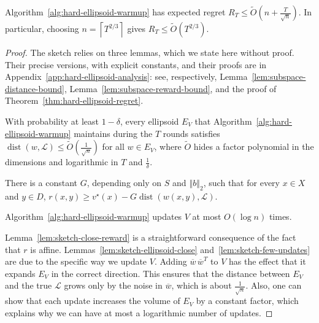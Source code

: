 {\begin{theorem}[Informal]\label{thm:hard-ellipsoid-warmup}
  Algorithm~\ref{alg:hard-ellipsoid-warmup} has expected regret $R_{T} \le \tilde{O} \left( n + \frac{T}{\sqrt{n}} \right)$. In particular, choosing $n = \left\lceil T^{2/3} \right\rceil$ gives
  $R_{T} \le \tilde{O} \left( T^{2/3} \right)$.

\end{theorem}


}

{
\begingroup
\renewcommand{\proofname}{Proof sketch}
\begin{proof}
The sketch relies on three lemmas, which we state here without proof. Their
precise versions, with explicit constants, and their proofs are in
Appendix~\ref{app:hard-ellipsoid-analysis}: see, respectively, Lemma~\ref{lem:subspace-distance-bound},
Lemma~\ref{lem:subspace-reward-bound}, and the proof of Theorem~\ref{thm:hard-ellipsoid-regret}.

\begin{lemma}\label{lem:sketch-ellipsoid-close}
With probability at least $1 - \delta$, every ellipsoid $E_{V}$ that
Algorithm~\ref{alg:hard-ellipsoid-warmup} maintains during the $T$ rounds satisfies
$\operatorname{dist} \left( w , \mathcal{L} \right) \le \tilde{O} \left( \frac{1}{\sqrt{n}} \right)$ for all
$w \in E_{V}$, where $\tilde{O}$ hides a factor polynomial in the dimensions and
logarithmic in $T$ and $\frac{1}{\delta}$.
\end{lemma}

\begin{lemma}\label{lem:sketch-close-reward}
There is a constant $G$, depending only on $S$ and ${\left\Vert b \right\Vert}_{2}$, such that
for every $x \in X$ and $y \in D$,
$r \left( x , y \right) \ge v^{\star} \left( x \right) - G \operatorname{dist} \left( w \left( x , y \right) , \mathcal{L} \right)$.
\end{lemma}

\begin{lemma}\label{lem:sketch-few-updates}
Algorithm~\ref{alg:hard-ellipsoid-warmup} updates $V$ at most $O \left( \log n  \right)$ times.
\end{lemma}

Lemma~\ref{lem:sketch-close-reward} is a straightforward consequence of the fact that $r$ is affine. Lemmas~\ref{lem:sketch-ellipsoid-close} and~\ref{lem:sketch-few-updates} are due to the specific way we update $V$. Adding $\overline{w} \, \overline{w}^{T}$ to $V$ has the effect that it expands $E_{V}$ in the correct direction. {This ensures that the distance between $E_{V}$ and the true $\mathcal{L}$ grows only by the noise in $\overline{w}$, which is about $\frac{1}{\sqrt{n}}$.} Also, one can show that each update increases the volume of $E_{V}$ by a constant factor, which explains why we can have at most a logarithmic number of updates.


\end{proof}}
